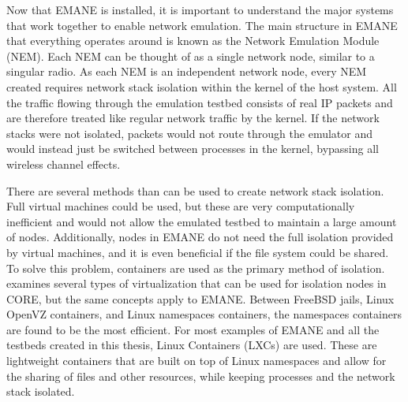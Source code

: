 Now that EMANE is installed, it is important to understand the major systems that work together to enable network emulation.
The main structure in EMANE that everything operates around is known as the Network Emulation Module (NEM).
Each NEM can be thought of as a single network node, similar to a singular radio.
As each NEM is an independent network node, every NEM created requires network stack isolation within the kernel of the host system.
All the traffic flowing through the emulation testbed consists of real IP packets and are therefore treated like regular network traffic by the kernel.
If the network stacks were not isolated, packets would not route through the emulator and would instead just be switched between processes in the kernel, bypassing all wireless channel effects.\par
There are several methods than can be used to create network stack isolation.
Full virtual machines could be used, but these are very computationally inefficient and would not allow the emulated testbed to maintain a large amount of nodes.
Additionally, nodes in EMANE do not need the full isolation provided by virtual machines, and it is even beneficial if the file system could be shared.
To solve this problem, containers are used as the primary method of isolation.
\cite{core_containers} examines several types of virtualization that can be used for isolation nodes in CORE, but the same concepts apply to EMANE.
Between FreeBSD jails, Linux OpenVZ containers, and Linux namespaces containers, the namespaces containers are found to be the most efficient.
For most examples of EMANE and all the testbeds created in this thesis, Linux Containers (LXCs) are used.
These are lightweight containers that are built on top of Linux namespaces and allow for the sharing of files and other resources, while keeping processes and the network stack isolated.\par

